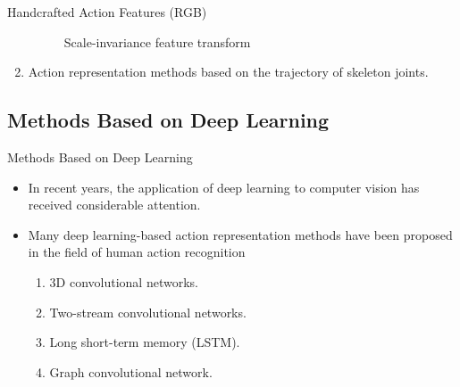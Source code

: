 \begin{frame}{Handcrafted Action Features (RGB)}
\begin{enumerate}
{\begin{figure}[htp]
                      \caption{Scale-invariance feature transform}
                  \end{figure}
              }
        \item<3-> Action representation methods based on the trajectory of skeleton joints.
    \end{enumerate}
\end{frame}

\subsection{Methods Based on Deep Learning}
\begin{frame}{Methods Based on Deep Learning}
    \begin{itemize}
        \item In recent years, the application of deep learning to computer vision has received considerable attention.
        \item Many deep learning-based action representation methods have been proposed in the field of human action recognition
              \begin{enumerate}
                  \item 3D convolutional networks.
                  \item Two-stream convolutional networks.
                  \item Long short-term memory (LSTM).
                  \item Graph convolutional network.
              \end{enumerate}
    \end{itemize}
\end{frame}

